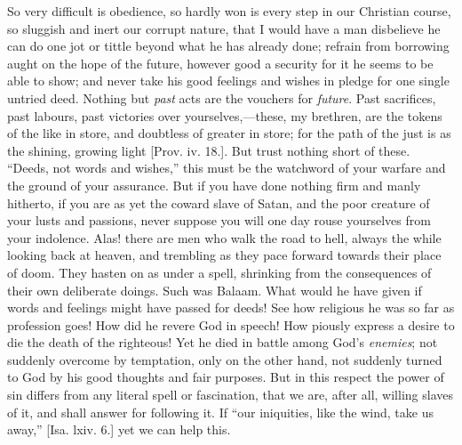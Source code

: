 So very difficult is obedience, so hardly won is every
step in our Christian course, so sluggish and inert our
corrupt nature, that I would have a man disbelieve he can
do one jot or tittle beyond what he has already done;
refrain from borrowing aught on the hope of the future,
however good a security for it he seems to be able to
show; and never take his good feelings and wishes in
pledge for one single untried deed. Nothing but \emph{past}
acts are the vouchers for \emph{future}. Past sacrifices,
past labours, past victories over yourselves,—these,
my brethren, are the tokens of the like in store, and
doubtless of greater in store; for the path of the just
is as the shining, growing light [Prov. iv. 18.]. But
trust nothing short of these. ``Deeds, not words and
wishes,'' this must be the watchword of your warfare
and the ground of your assurance. But if you have done
nothing firm and manly hitherto, if you are as yet the
coward slave of Satan, and the poor creature of your
lusts and passions, never suppose you will one day rouse
yourselves from your indolence. Alas! there are men who walk the road to hell, always the while looking back at
heaven, and trembling as they pace forward towards their
place of doom. They hasten on as under a spell, shrinking
from the consequences of their own deliberate doings.
Such was Balaam. What would he have given if words and
feelings might have passed for deeds! See how religious
he was so far as profession goes! How did he revere God
in speech! How piously express a desire to die the death
of the righteous! Yet he died in battle among God's \emph{enemies};
not suddenly overcome by temptation, only on the other
hand, not suddenly turned to God by his good thoughts and
fair purposes. But in this respect the power of sin
differs from any literal spell or fascination, that we
are, after all, willing slaves of it, and shall answer
for following it. If ``our iniquities, like the wind,
take us away,'' [Isa. lxiv. 6.] yet we can help this.

